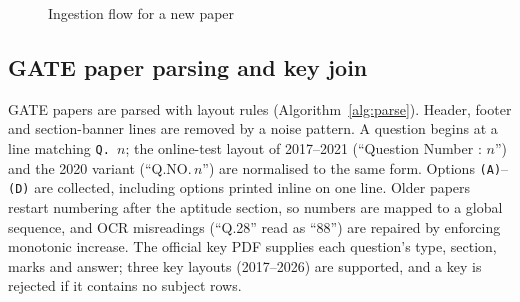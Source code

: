 \begin{figure}[t]
\centering
{}
\caption{Ingestion flow for a new paper}
\label{fig:ingest}
\end{figure}

\subsection{GATE paper parsing and key join}
GATE papers are parsed with layout rules (Algorithm~\ref{alg:parse}). Header, footer and section-banner lines are removed
by a noise pattern. A question begins at a line matching \texttt{Q.\,$n$}; the online-test layout of 2017--2021
(``Question Number : $n$'') and the 2020 variant (``Q.NO.\,$n$'') are normalised to the same form. Options \texttt{(A)}--%
\texttt{(D)} are collected, including options printed inline on one line. Older papers restart numbering after the
aptitude section, so numbers are mapped to a global sequence, and OCR misreadings (``Q.28'' read as ``88'') are repaired
by enforcing monotonic increase. The official key PDF supplies each question's type, section, marks and answer; three
key layouts (2017--2026) are supported, and a key is rejected if it contains no subject rows.


